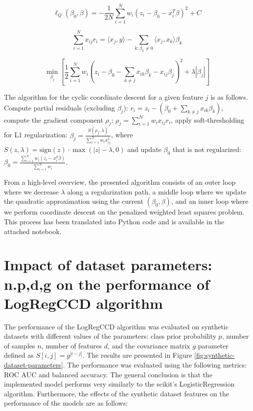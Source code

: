\documentclass[11pt]{article}
\begin{document}
\begin{equation}\label{eq:quadratic-approximation}
\ell_Q(\beta_0, \beta) = -\frac{1}{2N} \sum_{i=1}^{N} w_i (z_i - \beta_0 - x_i^T \beta)^2 + C
\end{equation}


\begin{equation}\label{eq:covariance-update}
\sum_{i=1}^{N} x_{ij} r_i = \langle x_j, y \rangle - \sum_{k: \beta_k \neq 0} \langle x_j, x_k \rangle \beta_k
\end{equation}

\begin{equation}\label{eq:feature-minimization}
    \min_{\beta_j} \left[ \frac{1}{2} \sum_{i=1}^{N} w_i \left( z_i - \beta_0 - \sum_{k \neq j} x_{ik} \beta_k - x_{ij} \beta_j \right)^2 + \lambda |\beta_j| \right]
\end{equation}


The algorithm for the cyclic coordinate descent for a given feature $j$ is as follows. Compute partial residuals (excluding $\beta_j$): $r_i = z_i - (\beta_0 + \sum_{k \neq j} x_{ik} \beta_k)$, compute the gradient component $\rho_j$: $\rho_j = \sum_{i=1}^{N} w_i x_{ij} r_i$, apply soft-thresholding for L1 regularization: $\beta_j = \frac{S(\rho_j, \lambda)}{\sum_{i=1}^{N} w_i x_{ij}^2}$, where $S(z, \lambda) = \text{sign}(z) \cdot \max(|z| - \lambda, 0)$ and update $\beta_0$ that is not regularized: $\beta_0 = \frac{\sum_{i=1}^{N} w_i (z_i - x_i^T \beta)}{\sum_{i=1}^{N} w_i}$.


From a high-level overview, the presented algorithm consists of an outer loop where we decrease $\lambda$ along a regularization path, a middle loop where we update the quadratic approximation using the current $(\beta_0, \beta)$, and an inner loop where we perform coordinate descent on the penalized weighted least squares problem. This process has been translated into Python code and is available in the attached notebook.



\section{Impact of dataset parameters: n.p,d,g on the performance of LogRegCCD algorithm}

The performance of the LogRegCCD algorithm was evaluated on synthetic datasets with different values of the parameters: class prior probability $p$, number of samples $n$, number of features $d$, and the covariance matrix $g$ parameter defined as $S[i,j] = g^{|i-j|}$. The results are presented in Figure \ref{fig:synthetic-dataset-parameters}. The performance was evaluated using the following metrics: ROC AUC and balanced accuracy. The general conclusion is that the implemented model performs very similarly to the scikit's LogisticRegression algorithm. Furthermore, the effects of the synthetic dataset features on the performance of the models are as follows:
\end{document}
